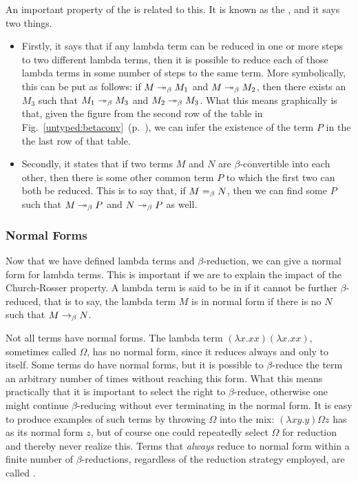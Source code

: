 An important property of the \lambdacalc is related to this. It is known as the , and it says two things.
\begin{itemize} 
\item Firstly, it says that if any lambda term can be reduced in one or more steps to two different lambda terms, then it is possible to reduce each of those lambda terms in some number of steps to the same term. More symbolically, this can be put as follows: if $M \betared[*] M_{1}$ and $M \betared[*] M_{2}$, then there exists an $M_{3}$ such that $M_{1} \betared[*] M_{3}$ and $M_{2} \betared[*] M_{3}$. What this means graphically is that, given the figure from the second row of the table in Fig.~\ref{untyped:betaconv}~(p.~\pageref{untyped:betaconv}), we can infer the existence of the term $P$ in the the last row of that table.
\item Secondly, it states that if two terms $M$ and $N$ are $\beta$-convertible into each other, then there is some other common term $P$ to which the first two can both be reduced. This is to say that, if $M =_{\beta} N$, then we can find some $P$ such that $M \betared[*] P$ and $N \betared[*] P$ as well.
\end{itemize}

\subsubsection{Normal Forms}\label{untyped:nf}
Now that we have defined lambda terms and $\beta$-reduction, we can give a normal form for lambda terms. This is important if we are to explain the impact of the Church-Rosser property. A lambda term is said to be in  if it cannot be further $\beta$-reduced, that is to say, the lambda term $M$ is in normal form if there is no $N$ such that $M \betared N$.

Not all terms have normal forms. The lambda term $(\lambda x.xx)(\lambda x.xx)$, sometimes called $\Omega$, has no normal form, since it reduces always and only to itself. Some terms do have normal forms, but it is possible to $\beta$-reduce the term an arbitrary number of times without reaching this form. What this means practically that it is important to select the right  to $\beta$-reduce, otherwise one might continue $\beta$-reducing without ever terminating in the normal form. It is easy to produce examples of such terms by throwing $\Omega$ into the mix: $(\lambda xy.y) \Omega z$ has as its normal form $z$, but of course one could repeatedly select $\Omega$ for reduction and thereby never realize this. Terms that \emph{always} reduce to normal form within a finite number of $\beta$-reductions, regardless of the reduction strategy employed, are called .

